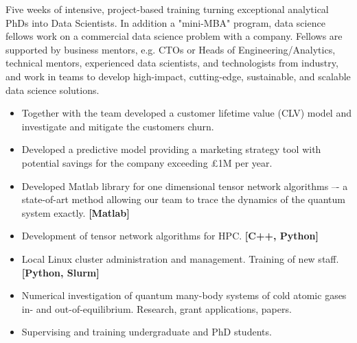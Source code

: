 \documentclass[10pt,a4paper,ragged2e,withhyper]{altacv}
\begin{document}
\divider

 
Five weeks of intensive, project-based training turning exceptional analytical
PhDs into Data Scientists.
In addition a "mini-MBA" program, data science fellows work on a commercial
data science problem with a company.
Fellows are supported by business mentors, e.g. CTOs or Heads of
Engineering/Analytics, technical mentors, experienced data scientists,
and technologists from industry, and work in teams to develop high-impact,
cutting-edge, sustainable, and scalable data science solutions.

\begin{itemize}

    \item
    Together with the team developed a customer lifetime value (CLV) model and investigate
    and mitigate the customers churn.
    
    \item
    Developed a predictive model providing a marketing strategy tool with potential
    savings for the company exceeding £1M per year.

\end{itemize}

\divider


\begin{itemize}

    \item
    Developed Matlab library for one dimensional tensor network algorithms –-
    a state-of-art method allowing our team to trace the dynamics of the
    quantum system exactly.
    {\bf [Matlab]}
    
    \item
    Development of tensor network algorithms for HPC.
    {\bf [C++, Python]}
    
    \item
    Local Linux cluster administration and management.
    Training of new staff.
    {\bf [Python, Slurm]}
    
    \item
    Numerical investigation of quantum many-body systems of cold atomic gases
    in- and out-of-equilibrium.
    Research, grant applications, papers.

    \item
    Supervising and training undergraduate and PhD students.

\end{itemize}
\end{document}
